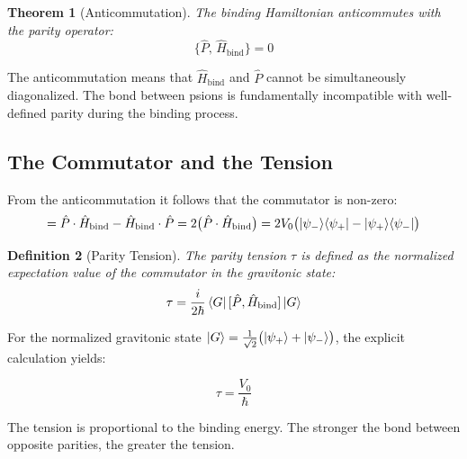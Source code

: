\documentclass[12pt,a4paper,twoside]{article}
\newtheorem{theorem}{Theorem}[section]
\newtheorem{definition}[theorem]{Definition}
\newcommand{\psion}{\psi}
\begin{document}
\begin{resultbox}[title={Theorem 2 --- Anticommutation}]
\begin{theorem}[Anticommutation]\label{thm:anticomutacao}
The binding Hamiltonian anticommutes with the parity operator:
\begin{equation}
\{\hat{P},\, \hat{H}_{\text{bind}}\} = 0
\end{equation}
\end{theorem}
\end{resultbox}

\noindent The anticommutation means that $\hat{H}_{\text{bind}}$ and $\hat{P}$ cannot be simultaneously diagonalized. The bond between psions is fundamentally incompatible with well-defined parity during the binding process.

\subsection{The Commutator and the Tension}

From the anticommutation it follows that the commutator is non-zero:
\begin{equation}
[\hat{P}, \hat{H}_{\text{bind}}] = \hat{P}\cdot\hat{H}_{\text{bind}} - \hat{H}_{\text{bind}}\cdot\hat{P} = 2\bigl(\hat{P}\cdot\hat{H}_{\text{bind}}\bigr) = 2V_0\bigl(\ket{\psion_-}\!\bra{\psion_+} - \ket{\psion_+}\!\bra{\psion_-}\bigr)
\label{eq:comutador}
\end{equation}

\begin{definition}[Parity Tension]
The parity tension $\tau$ is defined as the normalized expectation value of the commutator in the gravitonic state:
\begin{equation}
\tau = \frac{i}{2\hbar}\bra{G}[\hat{P}, \hat{H}_{\text{bind}}]\ket{G}
\label{eq:tensao_def}
\end{equation}
\end{definition}

\noindent For the normalized gravitonic state $\ket{G} = \frac{1}{\sqrt{2}}\bigl(\ket{\psion_+} + \ket{\psion_-}\bigr)$, the explicit calculation yields:
\begin{equationbox}[title={Parity Tension}]
\begin{equation}
\boxed{\tau = \frac{V_0}{\hbar}}
\label{eq:tensao_resultado}
\end{equation}
\end{equationbox}

\noindent The tension is proportional to the binding energy. The stronger the bond between opposite parities, the greater the tension.
\end{document}
